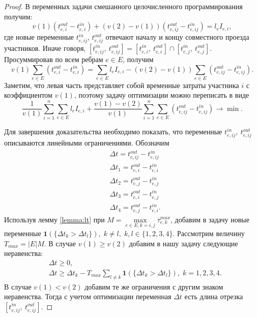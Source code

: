 \documentclass[12pt, a4paper]{article}
\DeclareMathOperator*{\minn}{min}
\begin{document}
\begin{proof}
	В переменных задачи смешанного целочисленного программирования получим:
	$$v(1) (t_{e, i}^{out} - t_{e, i}^{in}) + (v(2) - v(1)) (t_{e, ij}^{out} - t_{e, ij}^{in}) = l_e I_{e, i},$$
	где новые переменные $t_{e, ij}^{in}$, $t_{e, ij}^{out}$ отвечают началу и концу совместного проезда участников. Иначе говоря, $[t_{e, ij}^{in}, \: t_{e, ij}^{out}] = [t_{e, i}^{in}, \: t_{e, i}^{out}] \cap [t_{e, j}^{in}, \: t_{e, j}^{out}]$. Просуммировав по всем ребрам $e \in E$, получим
	$$v(1) \sum \limits _{e \in E} (t_{e, i}^{out} - t_{e, i}^{in}) = \sum \limits _{e \in E} l_e I_{e, i} - (v(2) - v(1)) \sum \limits _{e \in E} (t_{e, ij}^{out} - t_{e, ij}^{in}).$$
	Заметим, что левая часть представляет собой временные затраты участника $i$ с коэффициентом $v(1)$, поэтому задачу оптимизации можно переписать в виде
	$$ \frac{1}{v (1)} \sum\limits_{i = 1}^n \sum \limits _{e \in E} l_e I_{e, i} + \frac{v(1) - v(2)}{v (1)}  \sum\limits_{i = 1}^n \sum \limits _{e \in E} (t_{e, ij}^{out} - t_{e, ij}^{in}) \rightarrow \minn .$$
	
	Для завершения доказательства необходимо показать, что переменные $t_{e, ij}^{in}, \: t_{e, ij}^{out}$ описываются линейными ограничениями. Обозначим
	\begin{align*}
		& \Delta t = t_{e, ij}^{out} - t_{e, ij}^{in} \\
		& \Delta t_1 =  t_{e, i}^{out} - t_{e, i}^{in}  \\
		& \Delta t_2 =  t_{e, j}^{out} - t_{e, j}^{in} \\
		& \Delta t_3 =  t_{e, i}^{out} - t_{e, j}^{in} \\
		& \Delta t_4 =  t_{e, j}^{out} - t_{e, i}^{in}.
	\end{align*}
	Используя лемму \ref{lemma:lt} при $M = \max\limits_{e \in E, k = i, j} \overline{\tau}_{e, k}^{max}$, добавим в задачу новые переменные $\textbf{1} (\{ \Delta t_k > \Delta t_l\}), \; k \ne l, \; k, l \in \{1, 2, 3, 4\}$. Рассмотрим величину $T_{max} = |E|M$. В случае $v(1) \ge v(2)$ добавим в нашу задачу следующие неравенства: 
	\begin{align*}
	& \Delta t \ge 0, \\
	& \Delta t \ge \Delta t_k - T_{max} \sum \limits_{l \ne k} {\textbf{1} (\{ \Delta t_k > \Delta t_l\})}, \; k = 1, 2, 3, 4.
	\end{align*}
	В случае $v(1) < v(2)$ добавим те же ограничения с другим знаком неравенства. Тогда с учетом оптимизации переменная $\Delta t$ есть длина отрезка $[t_{e, ij}^{in}, \: t_{e, ij}^{out}]$. 
	
\end{proof}
\end{document}
